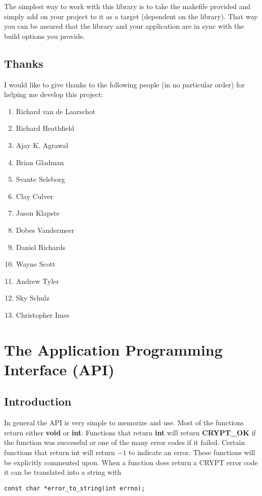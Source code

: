 \documentclass{book}
\begin{document}
The simplest way to work with this library is to take the makefile provided and simply add on your project to it as a 
target (dependent on the library).  That way you can be assured that the library and your application are in sync with
the build options you provide.

\section{Thanks}
I would like to give thanks to the following people (in no particular order) for helping me develop this project:
\begin{enumerate}
   \item Richard van de Laarschot
   \item Richard Heathfield
   \item Ajay K. Agrawal
   \item Brian Gladman
   \item Svante Seleborg
   \item Clay Culver
   \item Jason Klapste
   \item Dobes Vandermeer
   \item Daniel Richards
   \item Wayne Scott
   \item Andrew Tyler
   \item Sky Schulz
   \item Christopher Imes
\end{enumerate}

\chapter{The Application Programming Interface (API)}
\section{Introduction}
 

In general the API is very simple to memorize and use.  Most of the functions return either {\bf void} or {\bf int}.  Functions
that return {\bf int} will return {\bf CRYPT\_OK} if the function was successful or one of the many error codes 
if it failed.  Certain functions that return int will return $-1$ to indicate an error.  These functions will be explicitly
commented upon.  When a function does return a CRYPT error code it can be translated into a string with

\begin{verbatim}
const char *error_to_string(int errno);
\end{verbatim}
\end{document}
